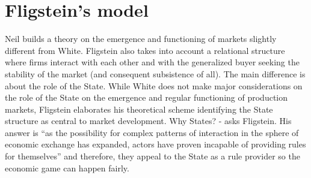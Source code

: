 \documentclass[a4paper, 12pt, openright, oneside, german, french, brazil, english, article]{abntex2}
\begin{document}
	
	
	\section{Fligstein's model}
	
	
	
	Neil  builds a theory on the emergence and functioning of markets slightly different from White. Fligstein also takes into account a relational structure where firms interact with each other and with the generalized buyer seeking the stability of the market (and consequent subsistence of all). The main difference is about the role of the State. While White does not make major considerations on the role of the State on the emergence and regular functioning of production markets, Fligstein elaborates his theoretical scheme identifying the State structure as central to market development. Why States? - asks Fligstein. His answer is ``as the possibility for complex patterns of interaction in the sphere of economic exchange has expanded, actors have proven incapable of providing rules for themselves'' \cite[p. 27-8]{fligstein2002architecture} and therefore, they appeal to the State as a rule provider so the economic game can happen fairly.
	
\end{document}
